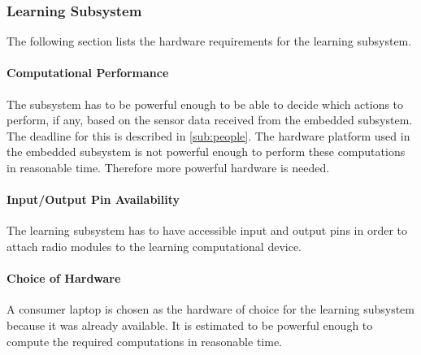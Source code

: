 \subsubsection{Learning Subsystem}
The following section lists the hardware requirements for the learning subsystem.

\paragraph{Computational Performance}
The subsystem has to be powerful enough to be able to decide which actions to perform, if any, based on the sensor data received from the embedded subsystem. The deadline for this is described in \cref{sub:people}. The hardware platform used in the embedded subsystem is not powerful enough to perform these computations in reasonable time. Therefore more powerful hardware is needed.

\paragraph{Input/Output Pin Availability}
The learning subsystem has to have accessible input and output pins in order to attach radio modules to the learning computational device.

\paragraph{Choice of Hardware}
A consumer laptop is chosen as the hardware of choice for the learning subsystem because it was already available. It is estimated to be powerful enough to compute the required computations in reasonable time.
